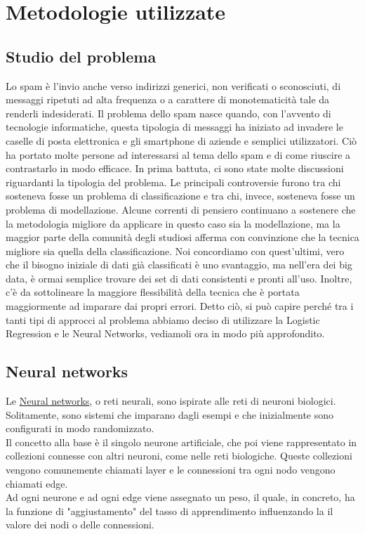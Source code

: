 \section{Metodologie utilizzate}

\subsection{Studio del problema}
Lo spam è l'invio anche verso indirizzi generici, non verificati o sconosciuti, di messaggi ripetuti ad alta frequenza o a carattere di monotematicità tale da renderli indesiderati. Il problema dello spam nasce quando, con l'avvento di tecnologie informatiche, questa tipologia di messaggi ha iniziato ad invadere le caselle di posta elettronica e gli smartphone di aziende e semplici utilizzatori. Ciò ha portato molte persone ad interessarsi al tema dello spam e di come riuscire a contrastarlo in modo efficace.
\newline
In prima battuta, ci sono state molte discussioni riguardanti la tipologia del problema. Le principali controversie furono tra chi sosteneva fosse un problema di classificazione e tra chi, invece, sosteneva fosse un problema di modellazione.
Alcune correnti di pensiero continuano a sostenere che la metodologia migliore da applicare in questo caso sia la modellazione, ma la maggior parte della comunità degli studiosi afferma con convinzione che la tecnica migliore sia quella della classificazione. Noi concordiamo con quest'ultimi, vero che il bisogno iniziale di dati già classificati è uno svantaggio, ma nell'era dei big data, è ormai semplice trovare dei set di dati consistenti e pronti all'uso. Inoltre, c'è da sottolineare la maggiore flessibilità della tecnica che è portata maggiormente ad imparare dai propri errori.
\newline
Detto ciò, si può capire perché tra i tanti tipi di approcci al problema abbiamo deciso di utilizzare la Logistic Regression e le Neural Networks, vediamoli ora in modo più approfondito.
\subsection{Neural networks}
Le \href{https://en.wikipedia.org/wiki/Neural_network}{Neural networks}, o reti neurali, sono ispirate alle reti di neuroni biologici. Solitamente, sono sistemi che imparano dagli esempi e che inizialmente sono configurati in modo randomizzato.\\
Il concetto alla base è il singolo neurone artificiale, che poi viene rappresentato in collezioni connesse con altri neuroni, come nelle reti biologiche. Queste collezioni vengono comunemente chiamati layer e le connessioni tra ogni nodo vengono chiamati edge.\\
Ad ogni neurone e ad ogni edge viene assegnato un peso, il quale, in concreto, ha la funzione di "aggiustamento" del tasso di apprendimento influenzando la il valore dei nodi o delle connessioni.

